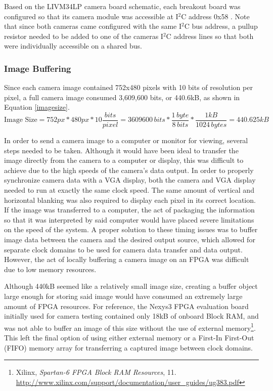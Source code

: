 Based on the LIVM34LP camera board schematic, each breakout board was configured so that its camera module was accessible at I$^2$C address 0x58 \cite{livm34lp,mt9v034}. Note that since both cameras came configured with the same I$^2$C bus address, a pullup resistor needed to be added to one of the cameras I$^2$C address lines so that both were individually accessible on a shared bus.

\subsubsection{Image Buffering}
Since each camera image contained 752x480 pixels with 10 bits of resolution per pixel, a full camera image consumed 3,609,600 bits, or 440.6kB, as shown in Equation \ref{imagesize}.
\begin{equation} \label{imagesize}
\textrm{Image Size} = 752px*480px*10\frac{bits}{pixel} = 3609600\,bits*\frac{1\,byte}{8\,bits}*\frac{1 kB}{1024\,bytes} = 440.625kB
\end{equation}
\par
In order to send a camera image to a computer or monitor for viewing, several steps needed to be taken. Although it would have been ideal to transfer the image directly from the camera to a computer or display, this was difficult to achieve due to the high speeds of the camera's data output. In order to properly synchronize camera data with a VGA display, both the camera and VGA display needed to run at exactly the same clock speed. The same amount of vertical and horizontal blanking was also required to display each pixel in its correct location. If the image was transferred to a computer, the act of packaging the information so that it was interpreted by said computer would  have placed severe limitations on the speed of the system. A proper solution to these timing issues was to buffer image data between the camera and the desired output source, which allowed for separate clock domains to be used for camera data transfer and data output. However, the act of locally buffering a camera image on an FPGA was difficult due to low memory resources. 
\par
Although 440kB seemed like a relatively small image size, creating a buffer object large enough for storing said image would have consumed an extremely large amount of FPGA resources. For reference, the Nexys3 FPGA evaluation board initially used for camera testing contained only 18kB of onboard Block RAM, and was not able to buffer an image of this size without the use of external memory\footnote{Xilinx, \textit{Spartan-6 FPGA Block RAM Resources}, 11.\\  \url{http://www.xilinx.com/support/documentation/user_guides/ug383.pdf}}. This left the final option of using either external memory or a First-In First-Out (FIFO) memory array for transferring a captured image between clock domains. 
